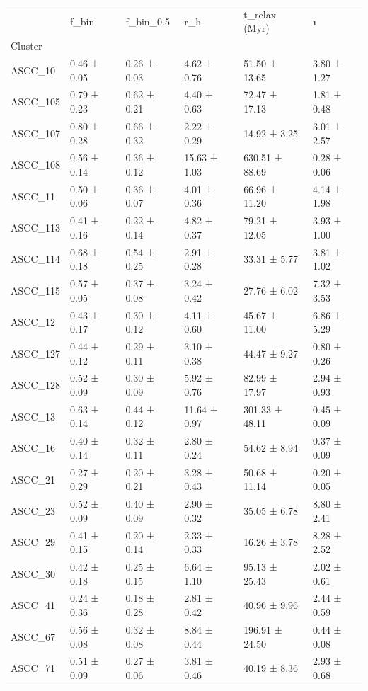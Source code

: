 \begin{tabular}{llllll}
\toprule
 & f_bin & f_bin_0.5 & r_h & t_relax (Myr) & τ \\
Cluster &  &  &  &  &  \\
\midrule
ASCC_10 & 0.46 ± 0.05 & 0.26 ± 0.03 & 4.62 ± 0.76 & 51.50 ± 13.65 & 3.80 ± 1.27 \\
ASCC_105 & 0.79 ± 0.23 & 0.62 ± 0.21 & 4.40 ± 0.63 & 72.47 ± 17.13 & 1.81 ± 0.48 \\
ASCC_107 & 0.80 ± 0.28 & 0.66 ± 0.32 & 2.22 ± 0.29 & 14.92 ± 3.25 & 3.01 ± 2.57 \\
ASCC_108 & 0.56 ± 0.14 & 0.36 ± 0.12 & 15.63 ± 1.03 & 630.51 ± 88.69 & 0.28 ± 0.06 \\
ASCC_11 & 0.50 ± 0.06 & 0.36 ± 0.07 & 4.01 ± 0.36 & 66.96 ± 11.20 & 4.14 ± 1.98 \\
ASCC_113 & 0.41 ± 0.16 & 0.22 ± 0.14 & 4.82 ± 0.37 & 79.21 ± 12.05 & 3.93 ± 1.00 \\
ASCC_114 & 0.68 ± 0.18 & 0.54 ± 0.25 & 2.91 ± 0.28 & 33.31 ± 5.77 & 3.81 ± 1.02 \\
ASCC_115 & 0.57 ± 0.05 & 0.37 ± 0.08 & 3.24 ± 0.42 & 27.76 ± 6.02 & 7.32 ± 3.53 \\
ASCC_12 & 0.43 ± 0.17 & 0.30 ± 0.12 & 4.11 ± 0.60 & 45.67 ± 11.00 & 6.86 ± 5.29 \\
ASCC_127 & 0.44 ± 0.12 & 0.29 ± 0.11 & 3.10 ± 0.38 & 44.47 ± 9.27 & 0.80 ± 0.26 \\
ASCC_128 & 0.52 ± 0.09 & 0.30 ± 0.09 & 5.92 ± 0.76 & 82.99 ± 17.97 & 2.94 ± 0.93 \\
ASCC_13 & 0.63 ± 0.14 & 0.44 ± 0.12 & 11.64 ± 0.97 & 301.33 ± 48.11 & 0.45 ± 0.09 \\
ASCC_16 & 0.40 ± 0.14 & 0.32 ± 0.11 & 2.80 ± 0.24 & 54.62 ± 8.94 & 0.37 ± 0.09 \\
ASCC_21 & 0.27 ± 0.29 & 0.20 ± 0.21 & 3.28 ± 0.43 & 50.68 ± 11.14 & 0.20 ± 0.05 \\
ASCC_23 & 0.52 ± 0.09 & 0.40 ± 0.09 & 2.90 ± 0.32 & 35.05 ± 6.78 & 8.80 ± 2.41 \\
ASCC_29 & 0.41 ± 0.15 & 0.20 ± 0.14 & 2.33 ± 0.33 & 16.26 ± 3.78 & 8.28 ± 2.52 \\
ASCC_30 & 0.42 ± 0.18 & 0.25 ± 0.15 & 6.64 ± 1.10 & 95.13 ± 25.43 & 2.02 ± 0.61 \\
ASCC_41 & 0.24 ± 0.36 & 0.18 ± 0.28 & 2.81 ± 0.42 & 40.96 ± 9.96 & 2.44 ± 0.59 \\
ASCC_67 & 0.56 ± 0.08 & 0.32 ± 0.08 & 8.84 ± 0.44 & 196.91 ± 24.50 & 0.44 ± 0.08 \\
ASCC_71 & 0.51 ± 0.09 & 0.27 ± 0.06 & 3.81 ± 0.46 & 40.19 ± 8.36 & 2.93 ± 0.68 \\

\end{tabular}
